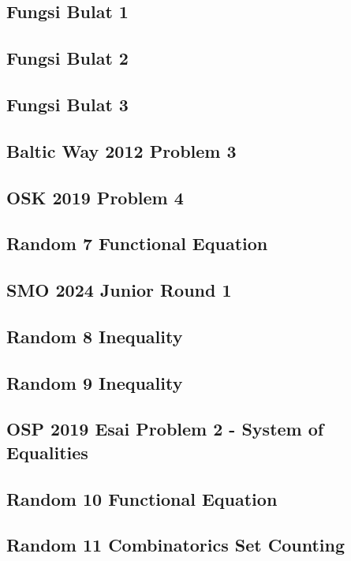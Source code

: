 \subsection{Fungsi Bulat 1}

\newpage

\subsection{Fungsi Bulat 2}

\newpage

\subsection{Fungsi Bulat 3}

\newpage

\subsection{Baltic Way 2012 Problem 3}

\newpage

\subsection{OSK 2019 Problem 4}

\newpage

\subsection{Random 7 Functional Equation}

\newpage

\subsection{SMO 2024 Junior Round 1}

\newpage

\subsection{Random 8 Inequality}

\newpage

\subsection{Random 9 Inequality}

\newpage

\subsection{OSP 2019 Esai Problem 2 - System of Equalities}

\newpage

\subsection{Random 10 Functional Equation}

\newpage

\subsection{Random 11 Combinatorics Set Counting}
